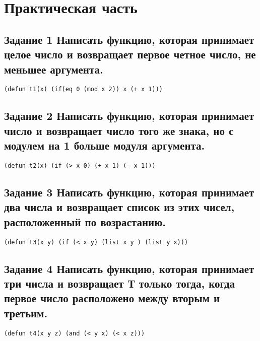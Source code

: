 \chapter{Практическая часть}

\section{Задание 1 Написать функцию, которая принимает целое число и возвращает первое
	четное число, не меньшее аргумента.}
\begin{center}
	\begin{lstlisting}[label=a1, caption={Выражение 1}]
(defun t1(x) (if(eq 0 (mod x 2)) x (+ x 1)))
\end{lstlisting}
\end{center}

\section{Задание 2 Написать функцию, которая принимает число и возвращает число
	того же знака, но с модулем на 1 больше модуля аргумента.}
\begin{center}
	\begin{lstlisting}[label=a2, caption={Выражение 2}]
(defun t2(x) (if (> x 0) (+ x 1) (- x 1)))
	\end{lstlisting}
\end{center}

\section{Задание 3 Написать функцию, которая принимает два числа и возвращает
	список из этих чисел, расположенный по возрастанию.}
\begin{center}
	\begin{lstlisting}[label=a3, caption={Выражение 3}]
(defun t3(x y) (if (< x y) (list x y ) (list y x)))
	\end{lstlisting}
\end{center}

\section{Задание 4 Написать функцию, которая принимает три числа и возвращает Т только
	тогда, когда первое число расположено между вторым и третьим.}
\begin{center}
	\begin{lstlisting}[label=a4, caption={Выражение 4}]
(defun t4(x y z) (and (< y x) (< x z)))
	\end{lstlisting}
\end{center}